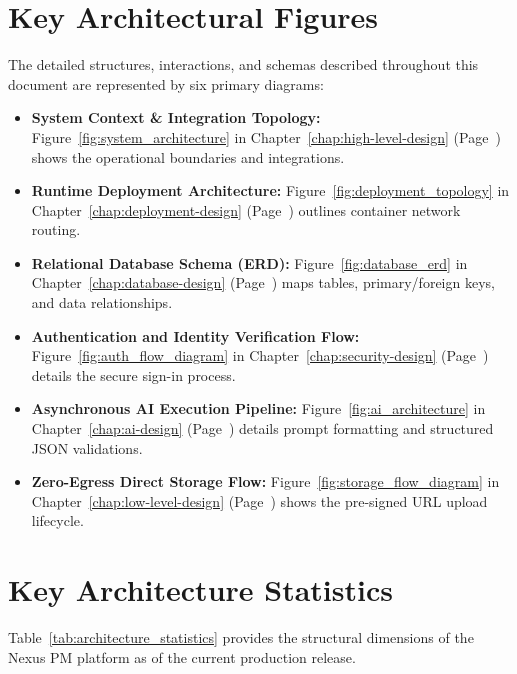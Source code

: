 \section{Key Architectural Figures}
The detailed structures, interactions, and schemas described throughout this document are represented by six primary diagrams:
\begin{itemize}
    \item \textbf{System Context \& Integration Topology:} Figure~\ref{fig:system_architecture} in Chapter~\ref{chap:high-level-design} (Page~\pageref{fig:system_architecture}) shows the operational boundaries and integrations.
    \item \textbf{Runtime Deployment Architecture:} Figure~\ref{fig:deployment_topology} in Chapter~\ref{chap:deployment-design} (Page~\pageref{fig:deployment_topology}) outlines container network routing.
    \item \textbf{Relational Database Schema (ERD):} Figure~\ref{fig:database_erd} in Chapter~\ref{chap:database-design} (Page~\pageref{fig:database_erd}) maps tables, primary/foreign keys, and data relationships.
    \item \textbf{Authentication and Identity Verification Flow:} Figure~\ref{fig:auth_flow_diagram} in Chapter~\ref{chap:security-design} (Page~\pageref{fig:auth_flow_diagram}) details the secure sign-in process.
    \item \textbf{Asynchronous AI Execution Pipeline:} Figure~\ref{fig:ai_architecture} in Chapter~\ref{chap:ai-design} (Page~\pageref{fig:ai_architecture}) details prompt formatting and structured JSON validations.
    \item \textbf{Zero-Egress Direct Storage Flow:} Figure~\ref{fig:storage_flow_diagram} in Chapter~\ref{chap:low-level-design} (Page~\pageref{fig:storage_flow_diagram}) shows the pre-signed URL upload lifecycle.
\end{itemize}

\section{Key Architecture Statistics}
Table~\ref{tab:architecture_statistics} provides the structural dimensions of the Nexus PM platform as of the current production release.

